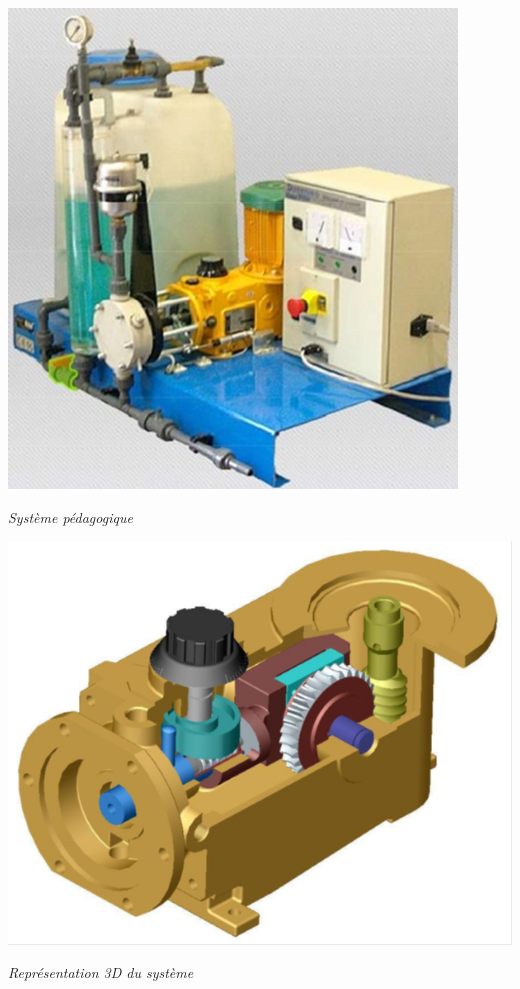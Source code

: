 \documentclass[10pt]{article}
\begin{document}

\begin{minipage}[b]{.3\linewidth}
\begin{center}
\includegraphics[width=.95\linewidth]{images/Doshydro_labo}

\textit{Système pédagogique}
\end{center}
\end{minipage} \hfill
\begin{minipage}[b]{.3\linewidth}
\begin{center}
\includegraphics[width=.95\linewidth]{images/Doshydro_SW}

\textit{Représentation 3D du système}
\end{center}
\end{minipage} \hfill
\end{document}
